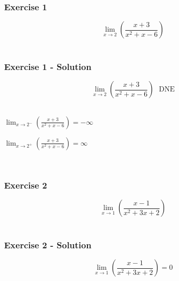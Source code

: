 \documentclass[12pt]{beamer}
\begin{document}
\begin{frame}
	\frametitle{Exercise 1}
	\vspace*{\fill}
	\vspace*{\fill}
	\vspace*{\fill}
	\initclock
	\Large
	\[\displaystyle\lim_{x\to2}\left(\frac{x+3}{x^2+x-6}\right)\]\\
	\vspace*{\fill}
	\vspace*{\fill}
	\vspace*{\fill}
	\vspace*{\fill}
	\crono
\end{frame}
\begin{frame}
	\frametitle{Exercise 1 - Solution}
	\vspace*{\fill}
	\Large
	\[\displaystyle\lim_{x\to2}\left(\frac{x+3}{x^2+x-6}\right) \text{ }\boxed{\text{DNE}}\]\\
	\small
	\vspace*{\fill}
	\vspace*{\fill}
	\begin{minipage}{0.5\textwidth}
		$\displaystyle\lim_{x\to2^{-}}\left(\frac{x+3}{x^2+x-6}\right)=-\infty$
	\end{minipage}%
	\begin{minipage}{0.5\textwidth}
		$\displaystyle\lim_{x\to2^{+}}\left(\frac{x+3}{x^2+x-6}\right)=\infty$
	\end{minipage}\\
	\vspace*{\fill}
	\vspace*{\fill}
\end{frame}
\begin{frame}
	\frametitle{Exercise 2}
	\vspace*{\fill}
	\vspace*{\fill}
	\vspace*{\fill}
	\initclock
	\Large
	\[\displaystyle\lim_{x\to1}\left(\frac{x-1}{x^2+3x+2}\right)\]\\
	\vspace*{\fill}
	\vspace*{\fill}
	\vspace*{\fill}
	\vspace*{\fill}
	\crono
\end{frame}
\begin{frame}
	\frametitle{Exercise 2 - Solution}
	\Large
	\[\displaystyle\lim_{x\to1}\left(\frac{x-1}{x^2+3x+2}\right) = \boxed{0}\]
\end{frame}
\end{document}

